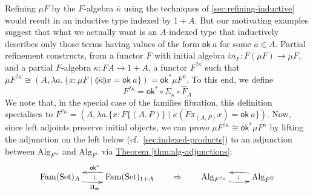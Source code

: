 \documentclass{LMCS}
\makeatletter
\newcommand{\inn}{\mathit{in}}
\newcommand{\sepbar}{\mathrel|}
\newcommand{\fold}[1]{\llparenthesis #1 \rrparenthesis}
\newcommand{\Fam}{\mathrm{Fam}}
\newcommand{\Set}{\mathrm{Set}}
\newcommand{\Alg}{\mathrm{Alg}}
\newcommand{\ok}{\mathsf{ok}}
\newcommand{\thmref}[1]{\hyperref[#1]{Theorem \ref*{#1}}}
\newcommand{\adjunction}[4]{\xymatrix{ {#1} \ar@/_/[r]_{#4}
    \ar@{}[r]|{\perp}& \ar@/_/[l]_{#3} {#2} }}
\makeatother
\begin{document}
Refining $\mu F$ by the $F$-algebra $\overline{\kappa}$ using the
techniques of \autoref{sec:refining-inductive} would result in an
inductive type indexed by $1+A$. But our motivating examples suggest
that what we actually want is an $A$-indexed type that inductively
describes only those terms having values of the form $\ok\ a$ for some
$a \in A$. Partial refinement constructs, from a functor $F$ with
initial algebra $\inn_F : F (\mu F) \to \mu F$, and a partial
$F$-algebra $\kappa : FA \to 1+A$, a functor $F^{?\kappa}$ such that
$\mu F^{?\kappa} \cong (A, \lambda a.\ \{ x : \mu F \sepbar
\fold{\overline{\kappa}} x = \ok\ a \}) = \ok^* \mu
F^{\overline{\kappa}}$. To this end, we define
\begin{equation}\label{eqn:Fkappa}
  F^{?\kappa} = \ok^* \circ \Sigma_{\kappa} \circ \hat{F}_A
\end{equation}
We note that, in the special case of the families fibration, this
definition specialises to $F^{?\kappa} = (A, \lambda a. \{ x :
F\{(A,P)\} \sepbar \kappa(F\pi_{(A,P)}x) = \ok\ a \})$. Now, since left
adjoints preserve initial objects, we can prove $\mu F^{?\kappa} \cong
\ok^* \mu F^{\overline{\kappa}}$ by lifting the adjunction on the left
below (cf.~\autoref{sec:indexed-products}) to an adjunction between
$\Alg_{F^{?\kappa}}$ and $\Alg_{F^{\overline{\kappa}}}$ via
\thmref{thm:alg-adjunctions}:
\begin{displaymath}
\begin{array}{lcl}
  \adjunction{\Fam(\Set)_A}{\Fam(\Set)_{1 +
      A}}{\ok^*}{\Pi_{\ok}} 
& \quad\Rightarrow\quad
&
  \adjunction{\Alg_{F^{?\kappa}}}{\Alg_{F^{\overline{\kappa}}}}{}{}  
\end{array}
\end{displaymath} 
\end{document}
